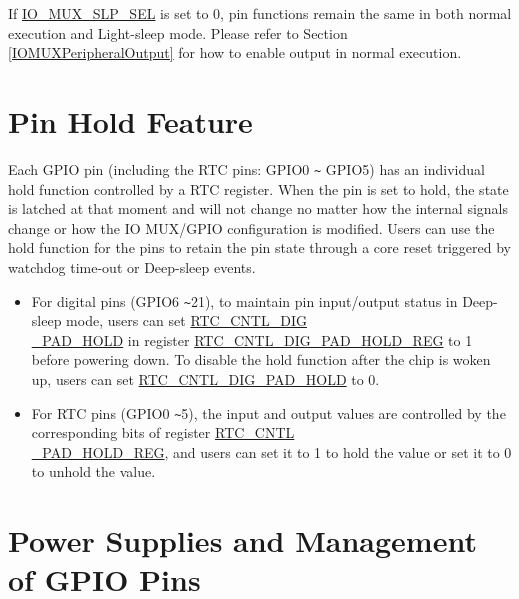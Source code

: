 \documentclass[main\_\_EN.tex]{subfiles}
\begin{document}
\begin{tiplisting}
If \hyperref[fielddesc:IOMUXGPIONSLPSEL]{IO\_MUX\_SLP\_SEL} is set to 0, pin functions remain the same in both normal execution and Light-sleep mode. Please refer to Section \ref{IOMUXPeripheralOutput} for how to enable output in normal execution. 
\end{tiplisting}

\section{Pin Hold Feature}\label{PadHold}

Each GPIO pin (including the RTC pins: GPIO0 \verb+~+ GPIO5) has an individual hold function controlled by a RTC register. When the pin is set to hold, the state is latched at that moment and will not change no matter how the internal signals change or how the IO MUX/GPIO configuration is modified. Users can use the hold function for the pins to retain the pin state through a core reset triggered by watchdog time-out or Deep-sleep events.

\begin{tiplisting}
\vspace{-2em}
\begin{itemize}
\item For digital pins (GPIO6 \verb+~+21), to maintain pin input/output status in Deep-sleep mode, users can set \hyperref[fielddesc:RTCCNTLDIGPADHOLD]{RTC\_CNTL\_DIG\\\_PAD\_HOLD} in register \hyperref[regdesc:RTCCNTLDIGPADHOLDREG]{RTC\_CNTL\_DIG\_PAD\_HOLD\_REG} to 1 before powering down. To disable the hold function after the chip is woken up, users can set \hyperref[fielddesc:RTCCNTLDIGPADHOLD]{RTC\_CNTL\_DIG\_PAD\_HOLD} to 0. 

\item For RTC pins (GPIO0 \verb+~+5), the input and output values are controlled by the corresponding bits of register \hyperref[regdesc:RTCCNTLPADHOLDREG]{RTC\_CNTL\\\_PAD\_HOLD\_REG}, and users can set it to 1 to hold the value or set it to 0 to unhold the value.
\end{itemize}
\end{tiplisting}

\vspace{-2em}
\section{Power Supplies and Management of GPIO Pins}\label{I/O Pad Power Supplies}
\end{document}
